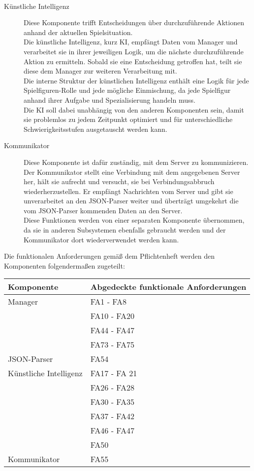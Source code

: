 \begin{description}
	\\
	\item[Künstliche Intelligenz] 
	Diese Komponente trifft Entscheidungen über durchzuführende Aktionen anhand der aktuellen Spielsituation.\\
	Die künstliche Intelligenz, kurz KI, empfängt Daten vom Manager und verarbeitet sie in ihrer jeweiligen Logik, um die nächste durchzuführende Aktion zu ermitteln. Sobald sie eine Entscheidung getroffen hat, teilt sie diese dem Manager zur weiteren Verarbeitung mit.\\
	Die interne Struktur der künstlichen Intelligenz enthält eine Logik für jede Spielfiguren-Rolle und jede mögliche Einmischung, da jede Spielfigur anhand ihrer Aufgabe und Spezialisierung handeln muss.\\
	Die KI soll dabei unabhängig von den anderen Komponenten sein, damit sie problemlos zu jedem Zeitpunkt optimiert und für unterschiedliche Schwierigkeitsstufen ausgetauscht werden kann.
	\\
	\item[Kommunikator]
	Diese Komponente ist dafür zuständig, mit dem Server zu kommunizieren.\\
	Der Kommunikator stellt eine Verbindung mit dem angegebenen Server her, hält sie aufrecht und versucht, sie bei Verbindungsabbruch wiederherzustellen. Er empfängt Nachrichten vom Server und gibt sie unverarbeitet an den JSON-Parser weiter und überträgt umgekehrt die vom JSON-Parser kommenden Daten an den Server.\\
	Diese Funktionen werden von einer separaten Komponente übernommen, da sie in anderen Subsystemen ebenfalls gebraucht werden und der Kommunikator dort wiederverwendet werden kann. 
\end{description}

Die funktionalen Anforderungen gemäß dem Pflichtenheft werden den Komponenten folgendermaßen zugeteilt:

\begin{center}
	\begin{tabular}{|l|l|}
		\hline
		\textbf{Komponente} & \textbf{Abgedeckte funktionale Anforderungen}\\\hline
		Manager & FA1 - FA8\\
		& FA10 - FA20\\
		& FA44 - FA47\\
		& FA73 - FA75\\\hline
		JSON-Parser & FA54\\\hline
		Künstliche Intelligenz & FA17 - FA 21\\
		& FA26 - FA28\\
		& FA30 - FA35\\
		& FA37 - FA42\\
		&FA46 - FA47\\
		&FA50\\\hline
		Kommunikator & FA55\\\hline
		
	\end{tabular}
\end{center}
